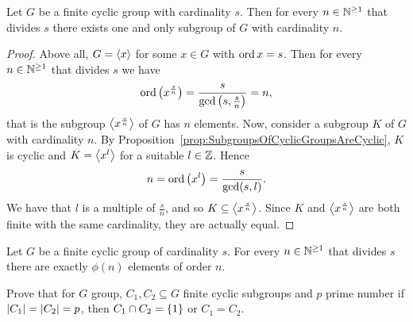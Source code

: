 \begin{proposition}\label{prop:CyclicOneAndOnlySubgroup}
Let \(G\) be a finite cyclic group with cardinality \(s\). Then for every \(n \in \mathbb N^{\ge 1}\) that divides \(s\) there exists one and only subgroup of \(G\) with cardinality \(n\).
\end{proposition}

\begin{proof}
Above all, \(G = \left\langle x\right\rangle\) for some \(x \in G\) with \(\operatorname{ord} x = s\). Then for every \(n \in \mathbb N^{\ge 1}\) that divides \(s\) we have
\[\operatorname{ord}\left(x^{\frac s n}\right) = \frac{s}{\gcd\left(s, \frac s n\right)} = n,\]
that is the subgroup \(\left\langle x^{\frac s n}\right\rangle\) of \(G\) has \(n\) elements. Now, consider a subgroup \(K\) of \(G\) with cardinality \(n\). By Proposition~\ref{prop:SubgroupsOfCyclicGroupsAreCyclic}, \(K\) is cyclic and \(K = \left\langle x^l\right\rangle\) for a suitable \(l \in \mathbb Z\). Hence
\[n = \operatorname{ord}{\left(x^l\right)} = \frac{s}{\gcd(s, l)}.\]
We have that \(l\) is a multiple of \(\frac s n\), and so \(K \subseteq \left\langle x^{\frac s n}\right\rangle\). Since \(K\) and \(\left\langle x^{\frac s n}\right\rangle\) are both finite with the same cardinality, they are actually equal.
\end{proof}

\begin{corollary}\label{cor:CyclicGroupsHavePhiNElemsOfOrdN}
Let \(G\) be a finite cyclic group of cardinality \(s\). For every \(n \in \mathbb N^{\ge 1}\) that divides \(s\) there are exactly \(\phi(n)\) elements of order \(n\).
\end{corollary}

\begin{exercise}
Prove that for \(G\) group, \(C_1, C_2 \subseteq G\) finite cyclic subgroups and \(p\) prime number if \(\left\lvert C_1\right\rvert = \left\lvert C_2\right\rvert = p\), then \(C_1 \cap C_2 = \left\{1\right\}\) or \(C_1 = C_2\).
\end{exercise}
